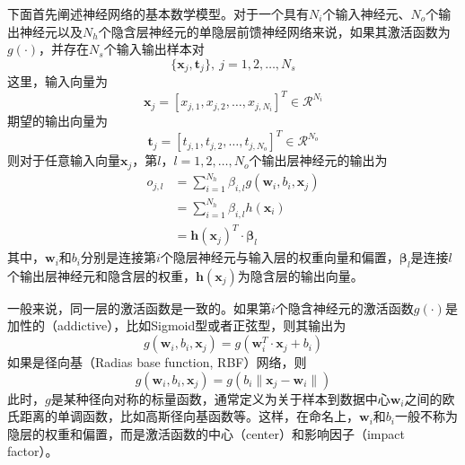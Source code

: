 下面首先阐述神经网络的基本数学模型。对于一个具有$N_{i}$个输入神经元、$N_{o}$个输出神经元以及$N_{h}$个隐含层神经元的单隐层前馈神经网络来说，如果其激活函数为$g(\cdot)$，并存在$N_{s}$个输入输出样本对
$$\{\bm{x}_{j},\bm{t}_{j}\},\ j=1,2,\ldots,N_{s}$$
这里，输入向量为
$$\bm{x}_{j}=[x_{j,1},x_{j,2},\ldots,x_{j,N_{i}}]^{T}\in \mathcal{R}^{N_{i}}$$
期望的输出向量为
$$\bm{t}_{j}=[t_{j,1},t_{j,2},\ldots,t_{j,N_{o}}]^{T}\in \mathcal{R}^{N_{o}}$$
则对于任意输入向量$\bm{x}_{j}$，第$l，l=1,2,\dots,N_{o}$个输出层神经元的输出为
\begin{equation}%
\label{eq:4.slfn}
\begin{split}%
o_{j,l}&=\sum_{i=1}^{N_{h}} \beta_{i,l} g(\bm{w}_{i},b_{i},\bm{x}_{j})\\
&=\sum_{i=1}^{N_{h}} \beta_{i,l} h(\bm{x}_{i})\\
&=\bm{h}(\bm{x}_{j})^{T}\cdot\bm{\beta}_{l}
\end{split}
\end{equation}
其中，$\bm{w}_{i}$和$b_{i}$分别是连接第$i$个隐层神经元与输入层的权重向量和偏置，$\bm{\beta}_{l}$是连接$l$个输出层神经元和隐含层的权重，$\bm{h}(\bm{x}_{j})$为隐含层的输出向量。

一般来说，同一层的激活函数是一致的。如果第$i$个隐含神经元的激活函数$g(\cdot)$是加性的（addictive），比如Sigmoid型或者正弦型，则其输出为
\begin{equation}%
g(\bm{w}_{i},b_{i},\bm{x}_{j})=g(\bm{w}_{i}^{T}\cdot\bm{x}_{j}+b_{i})
\end{equation}
如果是径向基（Radias base function, RBF）网络，则
\begin{equation}%
g(\bm{w}_{i},b_{i},\bm{x}_{j})=g(b_{i}\|\bm{x}_{j}-\bm{w}_{i}\|)
\end{equation}
此时，$g$是某种径向对称的标量函数，通常定义为关于样本到数据中心$\bm{w}_{i}$之间的欧氏距离的单调函数，比如高斯径向基函数等。这样，在命名上，$\bm{w}_{i}$和$b_{i}$一般不称为隐层的权重和偏置，而是激活函数的中心（center）和影响因子（impact factor）。

